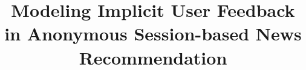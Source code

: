 \documentclass[sigconf]{acmart}
\begin{document}
\title{Modeling Implicit User Feedback in Anonymous Session-based 
News Recommendation}



\end{document}
